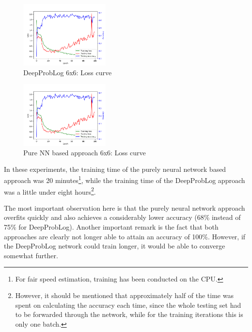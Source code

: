 \documentclass[english]{sobraep}
\begin{document}
\begin{figure}[htp]
    \begin{center}
    \includegraphics[width=0.40\textwidth]{loss_curve_deepproblog_6x6.png} 
    \captionsetup{justification=centering}
    \caption{DeepProbLog 6x6: Loss curve}
    \label{fig:loss_curve_deepproblog_6x6}
    \end{center}
\end{figure}

\begin{figure}[htp]
    \begin{center}
    \includegraphics[width=0.40\textwidth]{loss_curve_pure_NN_6x6.png} 
    \captionsetup{justification=centering}
    \caption{Pure NN based approach 6x6: Loss curve}
    \label{fig:loss_curve_pure_NN_6x6}
    \end{center}
\end{figure}

In these experiments, the training time of the purely neural network based approach was 20 minutes\footnote{For fair speed estimation, training has been conducted on the CPU.}, while the training time of the DeepProbLog approach was a little under eight hours\footnote{However, it should be mentioned that approximately half of the time was spent on calculating the accuracy each time, since the whole testing set had to be forwarded through the network, while for the training iterations this is only one batch.}.

The most important observation here is that the purely neural network approach overfits quickly and also achieves a considerably lower accuracy (68\% instead of 75\% for DeepProbLog). Another important remark is the fact that both approaches are clearly not longer able to attain an accuracy of 100\%. However, if the DeepProbLog network could train longer, it would be able to converge somewhat further.
\end{document}
